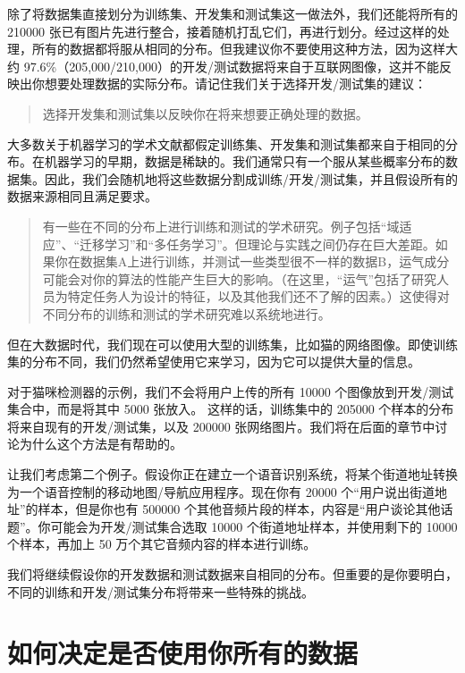 除了将数据集直接划分为训练集、开发集和测试集这一做法外，我们还能将所有的
210000
张已有图片先进行整合，接着随机打乱它们，再进行划分。经过这样的处理，所有的数据都将服从相同的分布。但我建议你不要使用这种方法，因为这样大约
97.6\%（205,000/210,000）的开发/测试数据将来自于互联网图像，这并不能反映出你想要处理数据的实际分布。请记住我们关于选择开发/测试集的建议：

\begin{quote}
选择开发集和测试集以反映你在将来想要正确处理的数据。
\end{quote}

大多数关于机器学习的学术文献都假定训练集、开发集和测试集都来自于相同的分布。在机器学习的早期，数据是稀缺的。我们通常只有一个服从某些概率分布的数据集。因此，我们会随机地将这些数据分割成训练/开发/测试集，并且假设所有的数据来源相同且满足要求。

\begin{quote}
有一些在不同的分布上进行训练和测试的学术研究。例子包括``域适应''、``迁移学习''和``多任务学习''。但理论与实践之间仍存在巨大差距。如果你在数据集A上进行训练，并测试一些类型很不一样的数据B，运气成分可能会对你的算法的性能产生巨大的影响。（在这里，``运气''包括了研究人员为特定任务人为设计的特征，以及其他我们还不了解的因素。）这使得对不同分布的训练和测试的学术研究难以系统地进行。
\end{quote}

但在大数据时代，我们现在可以使用大型的训练集，比如猫的网络图像。即使训练集的分布不同，我们仍然希望使用它来学习，因为它可以提供大量的信息。

对于猫咪检测器的示例，我们不会将用户上传的所有 10000
个图像放到开发/测试集合中，而是将其中 5000 张放入。 这样的话，训练集中的
205000 个样本的分布将来自现有的开发/测试集，以及 200000
张网络图片。我们将在后面的章节中讨论为什么这个方法是有帮助的。

让我们考虑第二个例子。假设你正在建立一个语音识别系统，将某个街道地址转换为一个语音控制的移动地图/导航应用程序。现在你有
20000 个``用户说出街道地址''的样本，但是你也有 500000
个其他音频片段的样本，内容是``用户谈论其他话题''。你可能会为开发/测试集合选取
10000 个街道地址样本，并使用剩下的 10000 个样本，再加上 50
万个其它音频内容的样本进行训练。

我们将继续假设你的开发数据和测试数据来自相同的分布。但重要的是你要明白，不同的训练和开发/测试集分布将带来一些特殊的挑战。

\hypertarget{ux5982ux4f55ux51b3ux5b9aux662fux5426ux4f7fux7528ux4f60ux6240ux6709ux7684ux6570ux636e}{%
\chapter{如何决定是否使用你所有的数据}\label{ux5982ux4f55ux51b3ux5b9aux662fux5426ux4f7fux7528ux4f60ux6240ux6709ux7684ux6570ux636e}}


